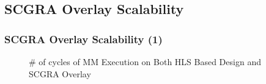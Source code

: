 \documentclass[accentcolor=tud1a,colorbacktitle,inverttitle,landscape,german,presentation,t]{tudbeamer}
\begin{document}
  \subsection{SCGRA Overlay Scalability}
  \begin{frame}
  \frametitle{SCGRA Overlay Scalability (1)}
  \vspace{-1em}
  \begin{figure}
  \centering
  \hfill
  \vspace{-0.8em}
  \caption{\# of cycles of MM Execution on Both HLS Based Design and SCGRA Overlay}
  \label{fig:mm-sim-perf}
  \end{figure}
  \end{frame}
\end{document}
